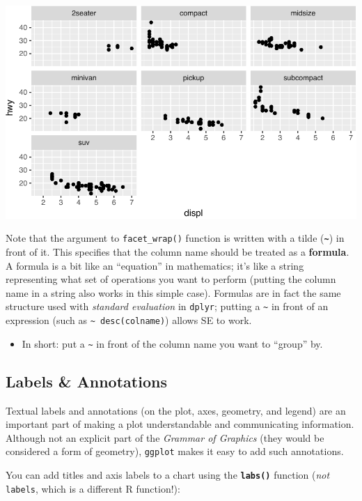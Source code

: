 \documentclass[]{book}
\providecommand{\tightlist}{%
  \setlength{\itemsep}{0pt}\setlength{\parskip}{0pt}}
\theoremstyle{definition}
\theoremstyle{definition}
\theoremstyle{remark}
\begin{document}
\includegraphics{img/ggplot2/facets-1.pdf}

Note that the argument to \texttt{facet\_wrap()} function is written
with a tilde (\textbf{\texttt{\textasciitilde{}}}) in front of it. This
specifies that the column name should be treated as a \textbf{formula}.
A formula is a bit like an ``equation'' in mathematics; it's like a
string representing what set of operations you want to perform (putting
the column name in a string also works in this simple case). Formulas
are in fact the same structure used with \emph{standard evaluation} in
\texttt{dplyr}; putting a \texttt{\textasciitilde{}} in front of an
expression (such as \texttt{\textasciitilde{}\ desc(colname)}) allows SE
to work.

\begin{itemize}
\tightlist
\item
  In short: put a \texttt{\textasciitilde{}} in front of the column name
  you want to ``group'' by.
\end{itemize}

\subsection{Labels \& Annotations}\label{labels-annotations}

Textual labels and annotations (on the plot, axes, geometry, and legend)
are an important part of making a plot understandable and communicating
information. Although not an explicit part of the \emph{Grammar of
Graphics} (they would be considered a form of geometry), \texttt{ggplot}
makes it easy to add such annotations.

You can add titles and axis labels to a chart using the
\textbf{\texttt{labs()}} function (\emph{not} \texttt{labels}, which is
a different R function!):
\end{document}
